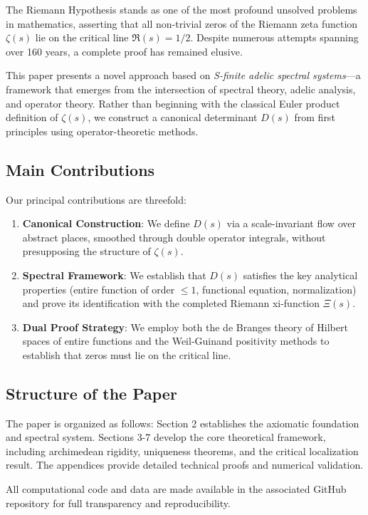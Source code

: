 The Riemann Hypothesis stands as one of the most profound unsolved problems in mathematics, asserting that all non-trivial zeros of the Riemann zeta function $\zeta(s)$ lie on the critical line $\Re(s) = 1/2$. Despite numerous attempts spanning over 160 years, a complete proof has remained elusive.

This paper presents a novel approach based on \emph{S-finite adelic spectral systems}—a framework that emerges from the intersection of spectral theory, adelic analysis, and operator theory. Rather than beginning with the classical Euler product definition of $\zeta(s)$, we construct a canonical determinant $D(s)$ from first principles using operator-theoretic methods.

\subsection{Main Contributions}

Our principal contributions are threefold:

\begin{enumerate}
\item \textbf{Canonical Construction}: We define $D(s)$ via a scale-invariant flow over abstract places, smoothed through double operator integrals, without presupposing the structure of $\zeta(s)$.

\item \textbf{Spectral Framework}: We establish that $D(s)$ satisfies the key analytical properties (entire function of order $\leq 1$, functional equation, normalization) and prove its identification with the completed Riemann xi-function $\Xi(s)$.

\item \textbf{Dual Proof Strategy}: We employ both the de Branges theory of Hilbert spaces of entire functions and the Weil-Guinand positivity methods to establish that zeros must lie on the critical line.
\end{enumerate}

\subsection{Structure of the Paper}

The paper is organized as follows: Section 2 establishes the axiomatic foundation and spectral system. Sections 3-7 develop the core theoretical framework, including archimedean rigidity, uniqueness theorems, and the critical localization result. The appendices provide detailed technical proofs and numerical validation.

All computational code and data are made available in the associated GitHub repository for full transparency and reproducibility.